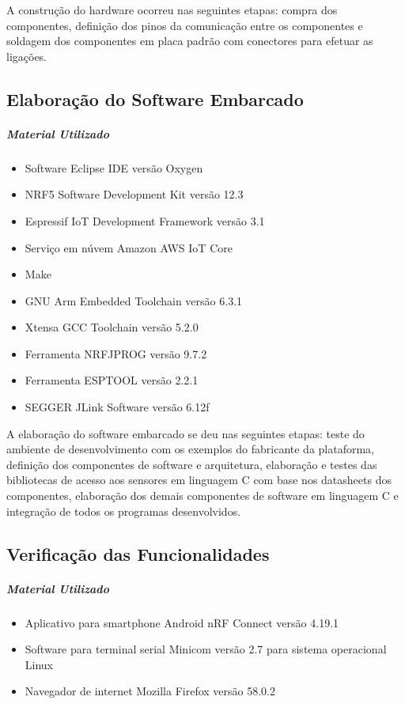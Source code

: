 A construção do hardware ocorreu nas seguintes etapas: compra dos
componentes, definição dos pinos da comunicação entre os componentes e soldagem
dos componentes em placa padrão com conectores para efetuar as ligações.


\subsection{Elaboração do Software Embarcado}

\subparagraph{Material Utilizado}
\begin{itemize}[noitemsep]
  \item Software Eclipse IDE versão Oxygen
  \item NRF5 Software Development Kit versão 12.3
  \item Espressif IoT Development Framework versão 3.1
  \item Serviço em núvem Amazon AWS IoT Core
  \item Make
  \item GNU Arm Embedded Toolchain versão 6.3.1
  \item Xtensa GCC Toolchain versão 5.2.0
  \item Ferramenta NRFJPROG versão 9.7.2
  \item Ferramenta ESPTOOL versão 2.2.1
  \item SEGGER JLink Software versão 6.12f
\end{itemize}

A elaboração do software embarcado se deu nas seguintes etapas: teste do
ambiente de desenvolvimento com os exemplos do fabricante da plataforma,
definição dos componentes de software e arquitetura, elaboração e testes das
bibliotecas de acesso aos sensores em linguagem C com base nos datasheets dos
componentes, elaboração dos demais componentes de software em linguagem C e
integração de todos os programas desenvolvidos.

\subsection{Verificação das Funcionalidades}

\subparagraph{Material Utilizado}
\begin{itemize}[noitemsep]
  \item Aplicativo para smartphone Android nRF Connect versão 4.19.1
  \item Software para terminal serial Minicom versão 2.7 para sistema
  operacional Linux
  \item Navegador de internet Mozilla Firefox versão 58.0.2
\end{itemize}

